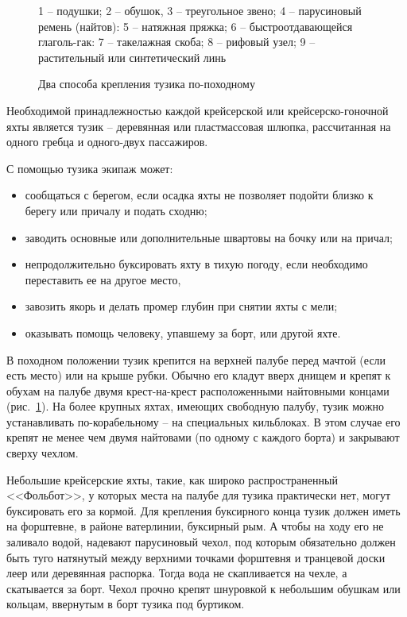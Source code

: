 \documentclass[a4paper, 12pt, twoside, final]{scrbook}
\begin{document}
\begin{figure}
	\caption{Два способа крепления тузика по-походному}
	\label{fig:132}
	\centering\small
	1 \--- подушки; 2 \--- обушок, 3 \--- треугольное звено; 4 \--- парусиновый ремень (найтов): 5 \--- натяжная пряжка; 6 \--- быстроотдавающейся глаголь-гак: 7 \--- такелажная скоба; 8 \--- рифовый узел; 9 \--- растительный или синтетический линь
\end{figure}

Необходимой принадлежностью каждой крейсерской или крейсерско-гоночной яхты является тузик \--- деревянная или пластмассовая шлюпка, рассчитанная на одного гребца и одного-двух пассажиров.

С помощью тузика экипаж может:

\begin{itemize}
\item сообщаться с берегом, если осадка яхты не позволяет подойти близко к берегу или причалу и подать сходню;
\item заводить основные или дополнительные швартовы на бочку или на причал;
\item непродолжительно буксировать яхту в тихую погоду, если необходимо переставить ее на другое место,
\item завозить якорь и делать промер глубин при снятии яхты с мели;
\item оказывать помощь человеку, упавшему за борт, или другой яхте.
\end{itemize}

В походном положении тузик крепится на верхней палубе перед мачтой (если есть место) или на крыше рубки. Обычно его кладут вверх днищем и крепят к обухам на палубе двумя крест-на-крест расположенными найтовными концами (рис.~\ref{fig:132}). На более крупных яхтах, имеющих свободную палубу, тузик можно устанавливать по-корабельному \--- на специальных кильблоках. В этом случае его крепят не менее чем двумя найтовами (по одному с каждого борта) и закрывают сверху чехлом.

Небольшие крейсерские яхты, такие, как широко распространенный <<Фольбот>>, у которых места на палубе для тузика практически нет, могут буксировать его за кормой. Для крепления буксирного конца тузик должен иметь на форштевне, в районе ватерлинии, буксирный рым. А чтобы на ходу его не заливало водой, надевают парусиновый чехол, под которым обязательно должен быть туго натянутый между верхними точками форштевня и транцевой доски леер или деревянная распорка. Тогда вода не скапливается на чехле, а скатывается за борт. Чехол прочно крепят шнуровкой к небольшим обушкам или кольцам, ввернутым в борт тузика под буртиком.
\end{document}
